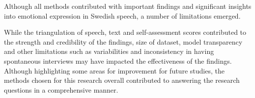 Although all methods contributed with important findings and significant insights into emotional expression in Swedish speech, a number of limitations emerged.

While the triangulation of speech, text and self-assessment scores contributed to the strength and credibility of the findings, size of dataset, model transparency and other limitations such as variabilities and inconsistency in having spontaneous interviews may have impacted the effectiveness of the findings. Although highlighting some areas for improvement for future studies, the methods chosen for this research overall contributed to answering the research questions in a comprehensive manner.